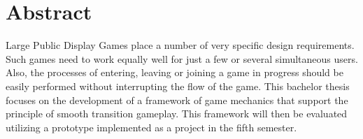 \chapter{Abstract}

\begin{english}
Large Public Display Games place a number of very specific design requirements. Such games need to work equally well for just a few or several simultaneous users. Also, the processes of entering, leaving or joining a game in progress should be easily performed without interrupting the flow of the game. This bachelor thesis focuses on the development of a framework of game mechanics that support the principle of smooth transition gameplay. This framework will then be evaluated utilizing a prototype implemented as a project in the fifth semester.

\end{english}
